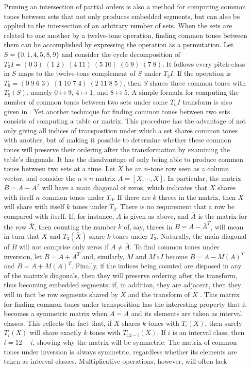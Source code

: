 Pruning an intersection of partial orders is also a method for computing common tones between sets that not only produces embedded segments, but can also be applied to the intersection of an arbitrary number of sets. When the sets are related to one another by a twelve-tone operation, finding common tones between them can be accomplished by expressing the operation as a permutation. Let $S = \{ 0, 1, 4, 5, 8, 9 \}$ and consider the cycle decomposition of $T_3I = (0 \; 3) \; (1 \; 2) \; (4 \; 11) \; (5 \; 10) \; (6 \; 9) \; (7 \; 8)$. It follows every pitch-class in $S$ maps to the twelve-tone complement of $S$ under $T_3I$. If the operation is $T_9 = (0 \; 9 \; 6 \; 3) \; (1 \; 10 \; 7 \; 4) \; (2 \; 11 \; 8 \; 5)$, then $S$ shares three common tones with $T_9(S)$, namely $0 \mapsto 9$, $4 \mapsto 1$, and $8 \mapsto 5$. A simple formula for computing the number of common tones between two sets under some $T_nI$ transform is also given in \cite[10]{Rahn1975}. Yet another technique for finding common tones between two sets consists of computing a table or matrix. This procedure has the advantage of not only giving all indices of transposition under which a set shares common tones with another, but of making it possible to determine whether these common tones will preserve their ordering after the transformation by examining the table's diagonals. It has the disadvantage of only being able to produce common tones between two sets at a time. Let $X$ be an $n$-tone row seen as a column vector, and consider the $n \times n$ matrix $A = [X, \cdots, X]$. In particular, the matrix $B = A - A^T$ will have a main diagonal of zeros, which indicates that $X$ shares with itself $n$ common tones under $T_0$. If there are $k$ threes in the matrix, then $X$ will share with itself $k$ tones under $T_3$. There is no requirement that a row be compared with itself. If, for instance, $A$ is given as above, and $\bar{A}$ is the matrix for the row $\bar{X}$, then counting the number $k$ of, say, threes in $B = A - \bar{A}^T$, will mean in turn that $X$ and $T_3(\bar{X})$ share $k$ tones under $T_3$. Naturally, the main diagonal of $B$ will not comprise only zeros if $A \ne \bar{A}$. To find common tones under inversion, let $B = A + A^T$ and, similarly, $M$ and $M \circ I$ become $B = A - M(A)^T$ and $B = A + M(A)^T$. Finally, if the indices being counted are disposed in any of the matrix's diagonals, then they will preserve ordering after the transform, thus becoming embedded segments; if, in addition, they are adjacent, then they will in fact be row segments shared by $X$ and the transform of $\bar{X}$ \cite[49]{Morris1987}. This matrix for finding common tones under transposition has the interesting property that it becomes a symmetric matrix when $A = \bar{A}$ and its elements are taken as interval classes. This reflects the fact that, if $X$ shares $k$ tones with $T_i(X)$, then surely $T_i(X)$ will share exactly $k$ tones with $T_{12 - i}(X)$. If $i$ is an interval class, then $i = 12 - i$, showing why the matrix will be symmetric. The matrix of common tones under inversion is always symmetric, regardless whether its elements are taken as interval classes. Multiplicative operations, however, will often lack 
